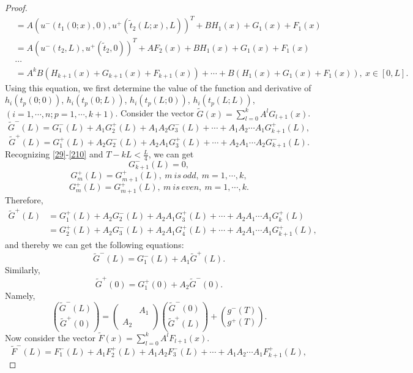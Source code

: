 \documentclass[a4paper,reqno,11pt]{amsart}
\numberwithin{equation}{section} %
\begin{document}
\begin{proof}
\begin{equation}
\begin{aligned}
							   &=A(u^- (t _1(0;x) ,0) ,u^+ (\tilde{t} _2 (L;x),L))^T + BH _1(x)+G_1(x)+F_1(x)\\
							   &=A(u^- (t _2 ,L) ,u^+ (\tilde{t} _2 ,0))^T +AF_2(x)+ BH _1(x)+G_1(x)+F_1(x)\\
							   & \cdots \\
							   &=A^kB(H_{k+1}\left( x \right)+G_{k+1}\left( x \right)+F_{k+1}\left( x \right)) +\cdots  +B(H_1\left( x \right)+G_1\left( x \right)+F_1\left( x \right)) ,\ x\in \left[ 0,L \right].
	\end{aligned}
	\end{equation}
Using this equation, we first determine the value of the function and derivative of $h_i(t_p(0;0))$, $h_i(t_p(0;L))$, $h_i(t_p(L;0))$, $h_i(t_p(L;L))$, $(i=1,\cdots,n; p=1,\cdots,k+1)$.
Consider the vector $\tilde{G}  (x) = \sum_{l=0}^k A^l G _{l+1}(x)$.
$$
\tilde{G}^-  (L) =G^- _1 (L) +A_1 G^+ _2 (L) +A_1 A_2 G^- _3 (L)  +\cdots +A_1 A_2 \cdots A_1 G^+ _{k+1} (L) ,
$$
$$
\tilde{G}^+  (L) =G^+ _1 (L) +A_2 G^- _2 (L) +A_2 A_1 G^+ _3 (L)  +\cdots +A_2 A_1 \cdots A_2 G^- _{k+1} (L) .
$$
Recognizing \eqref{29}-\eqref{210} and $T-kL < \frac{L}{4}$, we can get 
$$
G^- _{k+1}(L)=0,
$$
$$
G^+ _{m}(L) =G^+ _{m+1}(L) ,\ m\ is\ odd ,\ m=1,\cdots ,k,
$$
$$
G^+ _{m}(L) =G^+ _{m+1}(L) ,\ m\ is\ even ,\ m=1,\cdots ,k.
$$
Therefore,
\begin{equation}
	\begin{aligned}
		\tilde{G}^+  (L) &=G^+ _1 (L) +A_2 G^- _2 (L) +A_2 A_1 G^+ _3 (L)  +\cdots +A_2 A_1 \cdots A_1 G^+ _{k} (L) \\
		                 &=G^+ _2 (L) +A_2 G^- _3 (L) +A_2 A_1 G^+ _4 (L)  +\cdots +A_2 A_1 \cdots A_1 G^+ _{k+1} (L) ,
	\end{aligned}
\end{equation}
and thereby we can get the following equations:
$$
\tilde{G}^-  (L) =G^- _1 (L) +A_1 \tilde{G} ^+  (L) .
$$
Similarly,
$$
\tilde{G}^+  (0) =G^+ _1 (0) +A_2 \tilde{G} ^-  (0) .
$$
Namely, 
\begin{equation}\label{20}
    \binom{\tilde{G} ^{-}(L)}{\tilde{G}^{+}(0)}=\left(\begin{array}{ll} 
        & A_1 \\
        A_2 &
    \end{array}\right)\binom{\tilde{G}^{-}(0)}{\tilde{G} ^{+}(L)}+ \binom{g ^{-}(T)}{g ^{+}(T)}.
\end{equation}
Now consider the vector $\tilde{F}  (x) = \sum_{l=0}^k A^l F _{l+1}(x)$.
$$
\tilde{F}^-  (L) =F^- _1 (L) +A_1 F^+ _2 (L) +A_1 A_2 F^- _3 (L)  +\cdots +A_1 A_2 \cdots A_1 F^+ _{k+1} (L) ,
$$
\end{proof}
\end{document}
